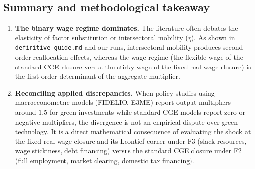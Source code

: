 \subsection{Summary and methodological takeaway}\label{app:summary}

\begin{enumerate}
\item \textbf{The binary wage regime dominates.} The literature often debates
  the elasticity of factor substitution or intersectoral mobility ($\eta$).
  As shown in \texttt{definitive\_guide.md} and our runs, intersectoral
  mobility produces second-order reallocation effects, whereas the wage regime
  (the flexible wage of the standard CGE closure versus the sticky wage of the
  fixed real wage closure) is the first-order determinant of the
  aggregate multiplier.
\item \textbf{Reconciling applied discrepancies.} When policy studies using
  macroeconometric models (FIDELIO, E3ME) report output multipliers around
  $1.5$ for green investments while standard CGE models report zero or
  negative multipliers, the divergence is not an empirical dispute over green
  technology. It is a direct mathematical consequence of evaluating the shock
  at the fixed real wage closure and its Leontief corner under F3 (slack
  resources, wage stickiness, debt financing) versus
  the standard CGE closure under F2 (full employment, market clearing,
  domestic tax financing).
\end{enumerate}